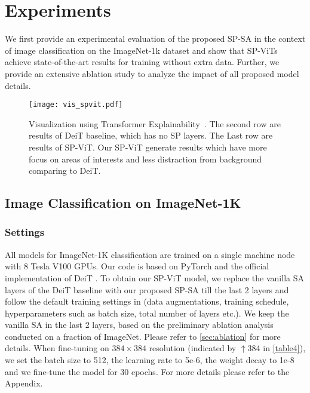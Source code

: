 \documentclass[authorversion, sigconf, acmthm=false, nonacm=true]{acmart}
\begin{document}
\section{Experiments}
We first provide an experimental evaluation of the proposed SP-SA in the context of image classification on the ImageNet-1k dataset and show that SP-ViTs achieve state-of-the-art results for training without extra data. Further, we provide an extensive ablation study to analyze the impact of all proposed model details.

\begin{figure*}[h]
  \centering
\texttt{[image: vis\_spvit.pdf]} 

  \caption{Visualization using Transformer Explainability~\cite{Chefer_2021_CVPR}. The second row are results of DeiT baseline, which has no SP layers. The Last row are results of SP-ViT. Our SP-ViT generate results which have more focus on areas of interests and less distraction from background comparing to DeiT.}
\label{vis_spvit}
  \end{figure*}

\subsection{Image Classification on ImageNet-1K}
   
\subsubsection{Settings}


    












All models for ImageNet-1K classification are trained on a single machine node with 8 Tesla V100 GPUs.
Our code is based on PyTorch \cite{paszke2019pytorch} and the official implementation of DeiT \cite{touvron2021training}.
To obtain our SP-ViT model, 
we replace the vanilla SA layers of the DeiT baseline with our proposed SP-SA till the last 2 layers and follow the default training settings in \cite{jiang2021all} (data augmentations,
training schedule, hyperparameters such as batch size, total number of layers etc.). 
We keep the vanilla SA in the last 2 layers, based on the preliminary ablation analysis conducted on a fraction of ImageNet. 
Please refer to \cref{sec:ablation} for more details.
When fine-tuning on $384\times384$ resolution (indicated by $\uparrow$384 in \cref{table4}), we set the batch size to 512, the learning rate to 5e-6, the
weight decay to 1e-8 and we fine-tune the model for 30 epochs. For more details please refer to the Appendix. 
\end{document}
